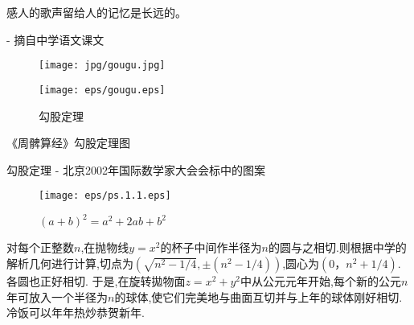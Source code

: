 \documentclass[main.tex]{subfiles}
\begin{document}
\begin{flushright}
	\begin{kaishu}
		感人的歌声留给人的记忆是长远的。\\
	\end{kaishu}
	- 摘自中学语文课文
\end{flushright}

\begin{figure}[h]
\centering
\begin{minipage}{.45\textwidth}
	\centering
	\texttt{[image: jpg/gougu.jpg]}
\end{minipage}
\begin{minipage}{.45\textwidth}
	\centering
	\texttt{[image: eps/gougu.eps]}
\end{minipage}
\caption{勾股定理}
 \label{fig:1.5.1}
\end{figure}	

{《周髀算经》勾股定理图}

勾股定理 - 北京2002年国际数学家大会会标中的图案
\begin{figure}[h]
	\centering
	\texttt{[image: eps/ps.1.1.eps]}
	\caption{$(a+b)^2 = a^2 + 2ab + b^2$}
	\label{fig:chap1.5.3}
\end{figure}	

对每个正整数$n$,在抛物线$y=x^2$的杯子中间作半径为$n$的圆与之相切.则根据中学的解析几何进行计算,切点为$(\sqrt{n^2-1/4}, \pm(n^2-1/4))$,圆心为$(0，n^2+1/4)$.各圆也正好相切.
于是,在旋转拋物面$z=x^2+y^2$中从公元元年开始,每个新的公元$n$年可放入一个半径为$n$的球体,使它们完美地与曲面互切并与上年的球体刚好相切.冷饭可以年年热炒恭贺新年.
\end{document}
